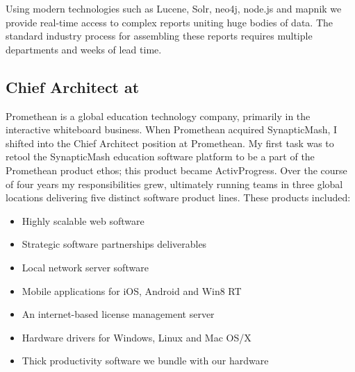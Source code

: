 Using modern technologies such as Lucene, Solr, neo4j, node.js and mapnik we provide real-time access to complex reports uniting huge bodies of data.  The standard industry process for assembling these reports requires multiple departments and weeks of lead time.

\subsection{\textbf{Chief Architect} at  \shyears{[2010-2014]}}
Promethean is a global education technology company, primarily in the interactive whiteboard business.  When Promethean acquired SynapticMash, I shifted into the Chief Architect position at Promethean.  My first task was to retool the SynapticMash education software platform to be a part of the Promethean product ethos; this product became ActivProgress.  Over the course of four years my responsibilities grew, ultimately running teams in three global locations delivering five distinct software product lines.  These products included:
\begin{itemize}
\itemsep-0.5em
\item{Highly scalable web software}
\item{Strategic software partnerships deliverables}
\item{Local network server software}
\item{Mobile applications for iOS, Android and Win8 RT}
\item{An internet-based license management server}
\item{Hardware drivers for Windows, Linux and Mac OS/X}
\item{Thick productivity software we bundle with our hardware}
\end{itemize}


